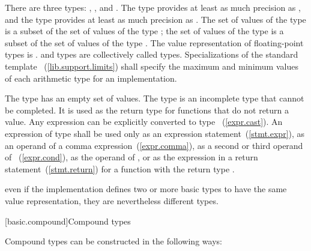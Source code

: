 \pnum
{}%
There are three  types:
%
,
%
,
and
%
. The type  provides at least as much
precision as , and the type  provides at
least as much precision as . The set of values of the type
 is a subset of the set of values of the type
; the set of values of the type  is a subset
of the set of values of the type  . The value
representation of floating-point types is .
%
%
 and  types are collectively
called  types.
%
Specializations of the standard template
~(\ref{lib.support.limits}) shall specify the
maximum and minimum values of each arithmetic type for an
implementation.

\pnum
{}%
The  type has an empty set of values. The  type
is an incomplete type that cannot be completed. It is used as the return
type for functions that do not return a value. Any expression can be
explicitly converted to type 
~(\ref{expr.cast}). An expression of type  shall
be used only as an expression statement~(\ref{stmt.expr}), as an operand
of a comma expression~(\ref{expr.comma}), as a second or third operand
of ~(\ref{expr.cond}), as the operand of , or as
the expression in a return statement~(\ref{stmt.return}) for a function
with the return type .

\pnum
\enternote 
even if the implementation defines two or more basic types to have the
same value representation, they are nevertheless different types.
\exitnote 

[basic.compound]{Compound types}

\pnum
{}%
Compound types can be constructed in the following ways:

